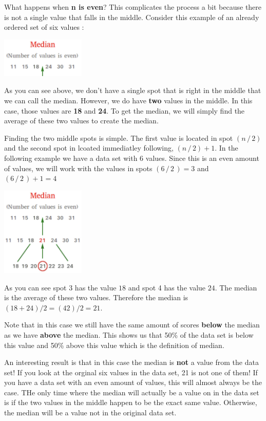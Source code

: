 \documentclass[
  letterpaper,
  DIV=11,
  numbers=noendperiod]{scrreprt}
\begin{document}
What happens when \textbf{n is even}? This complicates the process a bit
because there is not a single value that falls in the middle. Consider
this example of an already ordered set of six values :

\includegraphics[width=0.3\textwidth,height=\textheight]{./images/Daily-4-Pic-6.jpg}

As you can see above, we don't have a single spot that is right in the
middle that we can call the median. However, we do have \textbf{two}
values in the middle. In this case, those values are \textbf{18} and
\textbf{24}. To get the median, we will simply find the average of these
two values to create the median.

Finding the two middle spots is simple. The first value is located in
spot \((n\,/\,2)\) and the second spot in lcoated immediatley following,
\((n\,/\,2) + 1\). In the following example we have a data set with
\(6\) values. Since this is an even amount of values, we will work with
the values in spots \((6\,/\,2\,) = 3\) and \((6\,/\,2\,) + 1 = 4\)

\includegraphics[width=0.3\textwidth,height=\textheight]{./images/Daily-4-Pic-7.jpg}

As you can see spot 3 has the value \(18\) and spot 4 has the value
\(24\). The median is the average of these two values. Therefore the
median is \((18 + 24)/2 = (42) / 2 = 21\).

Note that in this case we still have the same amount of scores
\textbf{below} the median as we have \textbf{above} the median. This
shows us that 50\% of the data set is below this value and 50\% above
this value which is the definition of median.

An interesting result is that in this case the median is \textbf{not} a
value from the data set! If you look at the orginal six values in the
data set, 21 is not one of them! If you have a data set with an even
amount of values, this will almost always be the case. THe only time
where the median will actually be a value on in the data set is if the
two values in the middle happen to be the exact same value. Otherwise,
the median will be a value not in the original data set.
\end{document}
